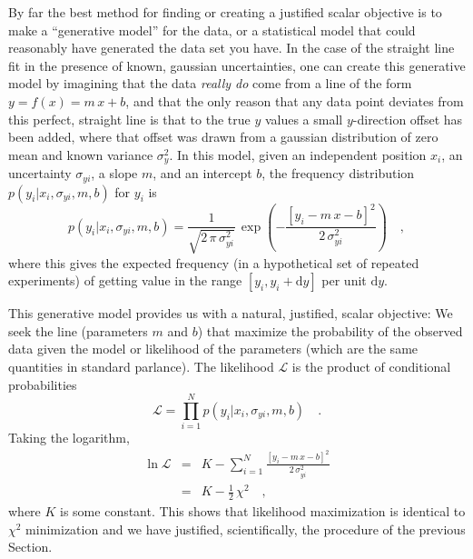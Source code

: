 \documentclass[12pt,twoside]{article}
\newcommand{\sectionname}{Section}
\renewcommand{\d}{\mathrm{d}}
\newcommand{\like}{\mathscr{L}}
\begin{document}
By far the best method for finding or creating a justified scalar
objective is to make a ``generative model'' for the data, or a
statistical model that could reasonably have generated the data set
you have.  In the case of the straight line fit in the presence of
known, gaussian uncertainties, one can create this generative model by
imagining that the data \emph{really do} come from a line of the form
$y = f(x) = m\,x+b$, and that the only reason that any data point
deviates from this perfect, straight line is that to the true $y$
values a small $y$-direction offset has been added, where that offset
was drawn from a gaussian distribution of zero mean and known variance
$\sigma_y^2$.  In this model, given an independent position $x_i$, an
uncertainty $\sigma_{yi}$, a slope $m$, and an intercept $b$, the
frequency distribution $p(y_i|x_i,\sigma_{yi},m,b)$ for $y_i$ is
\begin{equation}\label{eq:objectivei}
p(y_i|x_i,\sigma_{yi},m,b) = \frac{1}{\sqrt{2\,\pi\,\sigma_{yi}^2}}
 \,\exp\left(-\frac{[y_i - m\,x - b]^2}{2\,\sigma_{yi}^2}\right) \quad ,
\end{equation}
where this gives the expected frequency (in a hypothetical set of
repeated experiments) of getting value in the range $[y_i,y_i+\d y]$
per unit $\d y$.


This generative model provides us with a natural, justified, scalar
objective: We seek the line (parameters $m$ and $b$) that maximize the
probability of the observed data given the model or likelihood of the
parameters (which are the same quantities in standard parlance).  The
likelihood $\like$ is the product of conditional probabilities
\begin{equation}\label{eq:like}
\like = \prod_{i=1}^N p(y_i|x_i,\sigma_{yi},m,b) \quad .
\end{equation}
Taking the logarithm,
\begin{eqnarray}\displaystyle
\ln\like
 & = & K - \sum_{i=1}^N \frac{[y_i - m\,x - b]^2}{2\,\sigma_{yi}^2} \nonumber\\
 & = & K - \frac{1}{2}\,\chi^2 \quad ,
\end{eqnarray}
where $K$ is some constant.  This shows that likelihood maximization
is identical to $\chi^2$ minimization and we have justified,
scientifically, the procedure of the previous \sectionname.
\end{document}
